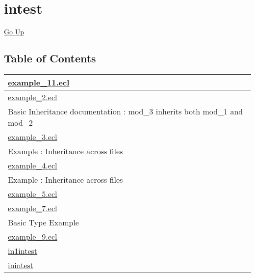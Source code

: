\chapter*{\color{headtoc} intest}
\hypertarget{ecldoc:toc:root/intest}{}
\hyperlink{ecldoc:toc:root}{Go Up}


\section*{Table of Contents}
{\renewcommand{\arraystretch}{1.5}
\begin{longtable}{|p{\textwidth}|}
\hline
\hyperlink{ecldoc:toc:intest.example_11}{example\_11.ecl} \\
\hline
\hyperlink{ecldoc:toc:intest.example_2}{example\_2.ecl} \\
Basic Inheritance documentation : mod\_3 inherits both mod\_1 and mod\_2 \\
\hline
\hyperlink{ecldoc:toc:intest.example_3}{example\_3.ecl} \\
Example : Inheritance across files \\
\hline
\hyperlink{ecldoc:toc:intest.example_4}{example\_4.ecl} \\
Example : Inheritance across files \\
\hline
\hyperlink{ecldoc:toc:intest.example_5}{example\_5.ecl} \\
\hline
\hyperlink{ecldoc:toc:intest.example_7}{example\_7.ecl} \\
Basic Type Example \\
\hline
\hyperlink{ecldoc:toc:intest.example_9}{example\_9.ecl} \\
\hline
\hyperlink{ecldoc:toc:root/intest/in1intest}{in1intest} \\
\hline
\hyperlink{ecldoc:toc:root/intest/inintest}{inintest} \\
\hline
\end{longtable}
}










